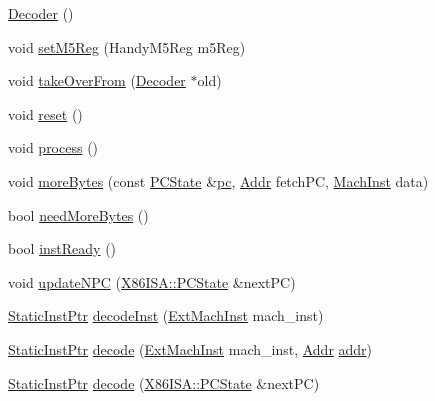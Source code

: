 \begin{DoxyCompactItemize}
\item 
\hyperlink{classX86ISA_1_1Decoder_aedfa2b7d97ed17b14903ed75d6214c78}{Decoder} ()
\item 
void \hyperlink{classX86ISA_1_1Decoder_a9b8f4112d3bbb779584ef8aaee237b25}{setM5Reg} (HandyM5Reg m5Reg)
\item 
void \hyperlink{classX86ISA_1_1Decoder_a83393f90e7cbd98eda9721ba6022d0e0}{takeOverFrom} (\hyperlink{classX86ISA_1_1Decoder}{Decoder} $\ast$old)
\item 
void \hyperlink{classX86ISA_1_1Decoder_ad20897c5c8bd47f5d4005989bead0e55}{reset} ()
\item 
void \hyperlink{classX86ISA_1_1Decoder_a2e9c5136d19b1a95fc427e0852deab5c}{process} ()
\item 
void \hyperlink{classX86ISA_1_1Decoder_a1345d078b309b7d115c57be1ed13ae38}{moreBytes} (const \hyperlink{classX86ISA_1_1PCState}{PCState} \&\hyperlink{namespaceX86ISA_aecb63c74e066ecd98e04d057e39028c9}{pc}, \hyperlink{base_2types_8hh_af1bb03d6a4ee096394a6749f0a169232}{Addr} fetchPC, \hyperlink{namespaceX86ISA_a7ceadb544bf9b4a10579b7466b0ac008}{MachInst} data)
\item 
bool \hyperlink{classX86ISA_1_1Decoder_a35631c47fc45b69ca30e6551f9f5d1d1}{needMoreBytes} ()
\item 
bool \hyperlink{classX86ISA_1_1Decoder_a9f6a0bc8946ca58d5d59a5dbc6a3181f}{instReady} ()
\item 
void \hyperlink{classX86ISA_1_1Decoder_aab3a5fb7c37867f52f6fa72cc56ceb5e}{updateNPC} (\hyperlink{classX86ISA_1_1PCState}{X86ISA::PCState} \&nextPC)
\item 
\hyperlink{classRefCountingPtr}{StaticInstPtr} \hyperlink{classX86ISA_1_1Decoder_a148768e0e9062eb41f604040d0ea86e6}{decodeInst} (\hyperlink{structX86ISA_1_1ExtMachInst}{ExtMachInst} mach\_\-inst)
\item 
\hyperlink{classRefCountingPtr}{StaticInstPtr} \hyperlink{classX86ISA_1_1Decoder_a4ed948f8d08575cc2916fe32154ea69d}{decode} (\hyperlink{structX86ISA_1_1ExtMachInst}{ExtMachInst} mach\_\-inst, \hyperlink{base_2types_8hh_af1bb03d6a4ee096394a6749f0a169232}{Addr} \hyperlink{namespaceX86ISA_ab705917f60c5566f9ce56a93f798b2e2}{addr})
\item 
\hyperlink{classRefCountingPtr}{StaticInstPtr} \hyperlink{classX86ISA_1_1Decoder_a2aa7b25617e9f15447ee6e934f4a3529}{decode} (\hyperlink{classX86ISA_1_1PCState}{X86ISA::PCState} \&nextPC)
\end{DoxyCompactItemize}
